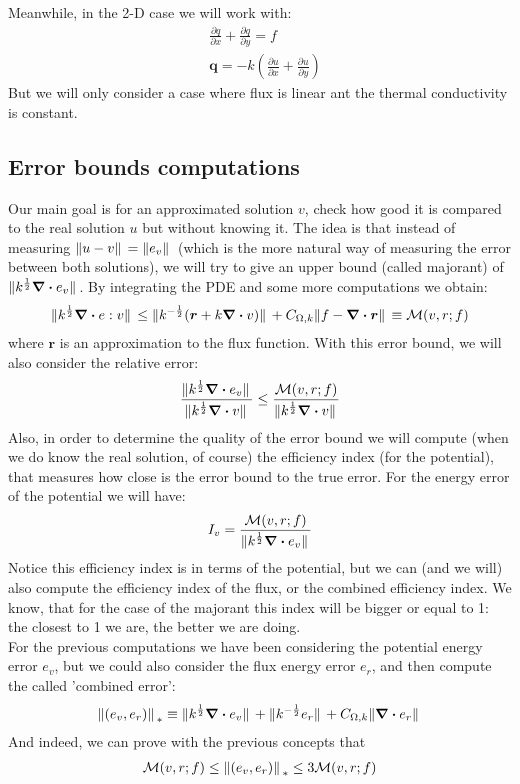 \documentclass{article}
\begin{document}
    Meanwhile, in the 2-D case we will work with:
    \begin{align*}
        &\frac{\partial q}{\partial x} + \frac{\partial q}{\partial y}  = f \\
        &\bm{q} = -k \left( \frac{\partial u}{\partial x} + \frac{\partial u}{\partial y}\right)
    \end{align*}
    But we will only consider a case where flux is linear ant the thermal conductivity is constant.
    
    \subsection*{Error bounds computations}
    Our main goal is for an approximated solution $v$, check how good it is compared to the real solution $u$ but without knowing it. The idea is that instead of measuring $\norm*{u-v} = \norm*{e_v}$ (which is the more natural way of measuring the error between both solutions), we will try to give an upper bound (called majorant) of $\norm*{k^{\frac{1}{2}}\div e_v}$. By integrating the PDE and some more computations we obtain:
    \begin{align*}
        \norm*{k^{\frac{1}{2}}\div e:v} \leq \norm*{k^{-\frac{1}{2}}(\bm{r}+k\div v)} + C_{\Omega,k}\norm*{f-\div \bm{r}} \equiv \mathcal{M}(v,r;f)
    \end{align*}
    where $\bm{r}$ is an approximation to the flux function.
    With this error bound, we will also consider the relative error:
    \begin{align*}
        \frac{\norm*{k^{\frac{1}{2}}\div e_v}}{\norm*{k^{\frac{1}{2}}\div v}} \leq \frac{\mathcal{M}(v,r;f)}{\norm*{k^{\frac{1}{2}}\div v}}
    \end{align*}
    Also, in order to determine the quality of the error bound we will compute (when we do know the real solution, of course) the efficiency index (for the potential), that measures how close is the error bound to the true error. For the energy error of the potential we will have:
    \begin{align*}
        I_v = \frac{\mathcal{M}(v,r;f)}{\norm*{k^{\frac{1}{2}}\div e_v}}
    \end{align*}
    Notice this efficiency index is in terms of the potential, but we can (and we will) also compute the efficiency index of the flux, or the combined efficiency index.
    We know, that for the case of the majorant this index will be bigger or equal to 1: the closest to 1 we are, the better we are doing.\\
    For the previous computations we have been considering the potential energy error $e_v$, but we could also consider the flux energy error $e_r$, and then compute the called 'combined error':
    \begin{align*}
        \norm*{(e_v,e_r)}_{*} \equiv \norm*{k^{\frac{1}{2}}\div e_v} + \norm*{k^{-\frac{1}{2}}e_r} + C_{\Omega,k}\norm*{\div e_r}
    \end{align*} 
    And indeed, we can prove with the previous concepts that 
    \begin{align*}
        \mathcal{M}(v,r;f) \leq  \norm*{(e_v,e_r)}_{*}  \leq 3\mathcal{M}(v,r;f)
    \end{align*}
\end{document}
